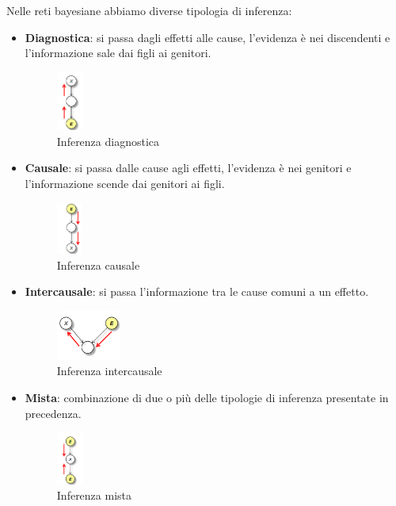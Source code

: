Nelle reti bayesiane abbiamo diverse tipologia di inferenza:
\begin{itemize}
    \item \textbf{Diagnostica}: si passa dagli effetti alle cause, l'evidenza è
          nei discendenti e l'informazione sale dai figli ai genitori.
          \begin{figure}[!ht]
              \centering
              \includegraphics[width=0.08\textwidth]{./img/Reti/Diagnostica.png}
              \caption{Inferenza diagnostica}
              \label{fig:diagnostica}
          \end{figure}
    \item \textbf{Causale}: si passa dalle cause agli effetti, l'evidenza è
          nei genitori e l'informazione scende dai genitori ai figli.
          \begin{figure}[!ht]
              \centering
              \includegraphics[width=0.08\textwidth]{./img/Reti/Causale.png}
              \caption{Inferenza causale}
              \label{fig:causale}
          \end{figure}
    \item \textbf{Intercausale}: si passa l'informazione tra le cause comuni
          a un effetto.
          \begin{figure}[!ht]
              \centering
              \includegraphics[width=0.2\textwidth]{./img/Reti/Intercausale.png}
              \caption{Inferenza intercausale}
              \label{fig:intercausale}
          \end{figure}
    \item \textbf{Mista}: combinazione di due o più delle tipologie di inferenza
          presentate in precedenza.
          \begin{figure}[!ht]
              \centering
              \includegraphics[width=0.08\textwidth]{./img/Reti/Mista.png}
              \caption{Inferenza mista}
              \label{fig:mista}
          \end{figure}
\end{itemize}

